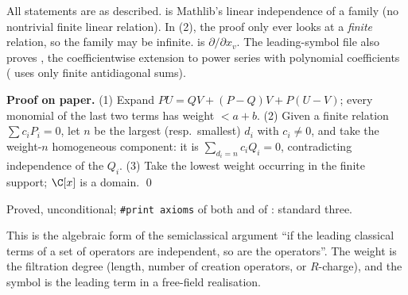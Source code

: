 \begin{dictionary}
All statements are as described.  is Mathlib's linear independence of a family
(no nontrivial finite linear relation). In (2), the proof only ever looks at a \emph{finite} relation, so the
family may be infinite.  is $\partial/\partial x_v$. The leading-symbol file also proves
, the coefficientwise extension to power series with polynomial coefficients (
uses only finite antidiagonal sums).
\end{dictionary}

\textbf{Proof on paper.} (1) Expand $PU = QV + (P-Q)V + P(U-V)$; every monomial of the last two terms has weight
$<a+b$. (2) Given a finite relation $\sum c_iP_i = 0$, let $n$ be the largest (resp.\ smallest) $d_i$ with
$c_i\ne0$, and take the weight-$n$ homogeneous component: it is $\sum_{d_i=n}c_iQ_i = 0$, contradicting
independence of the $Q_i$. (3) Take the lowest weight occurring in the finite support; $\C[x]$ is a domain. \qed

\begin{status}
Proved, unconditional; \texttt{\#print axioms} of both \allowbreak{}\allowbreak{} and of
: standard three.
\end{status}

\begin{physics}
This is the algebraic form of the semiclassical argument ``if the leading classical terms of a set of operators are
independent, so are the operators''. The weight is the filtration degree (length, number of creation operators,
or $R$-charge), and the symbol is the leading term in a free-field realisation.
\end{physics}

